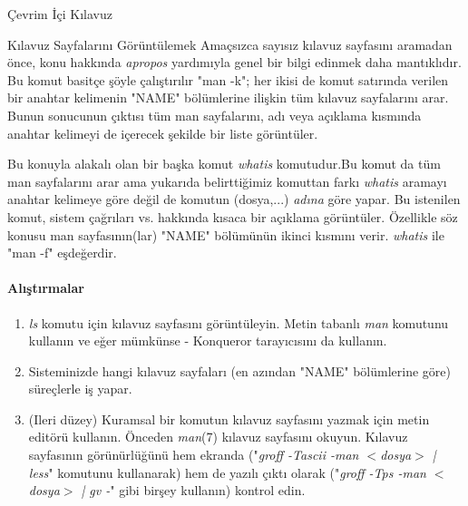 \begin{section}{Çevrim İçi Kılavuz}
\begin{subsection}{Kılavuz Sayfalarını Görüntülemek}
Amaçsızca sayısız kılavuz sayfasını aramadan önce, konu hakkında \emph{apropos} yardımıyla genel bir bilgi edinmek daha mantıklıdır. Bu komut basitçe şöyle çalıştırılır "man -k"; her ikisi de komut satırında verilen bir anahtar kelimenin "NAME" bölümlerine ilişkin tüm kılavuz sayfalarını arar. Bunun sonucunun çıktısı tüm man sayfalarını, adı veya açıklama kısmında anahtar kelimeyi de içerecek şekilde bir liste görüntüler.

Bu konuyla alakalı olan bir başka komut \emph{whatis} komutudur.Bu komut da tüm man sayfalarını arar ama yukarıda belirttiğimiz komuttan farkı \emph{whatis} aramayı anahtar kelimeye göre değil de komutun (dosya,...) \emph{adına} göre yapar. Bu istenilen komut, sistem çağrıları vs. hakkında kısaca bir açıklama görüntüler. Özellikle söz konusu man sayfasının(lar) "NAME" bölümünün ikinci  kısmını verir. \emph{whatis} ile "man -f" eşdeğerdir.
\paragraph{{\Huge{\PencilLeftDown}}Alıştırmalar}{
\begin{enumerate}
 \item \emph{ls} komutu için kılavuz sayfasını görüntüleyin. Metin tabanlı \emph{man} komutunu kullanın ve eğer mümkünse - Konqueror tarayıcısını da kullanın.
 \item Sisteminizde hangi kılavuz sayfaları (en azından "NAME" bölümlerine göre) süreçlerle iş yapar.
 \item (Ileri düzey) Kuramsal bir komutun kılavuz sayfasını yazmak için metin editörü kullanın. Önceden \emph{man}(7) kılavuz sayfasını okuyun. Kılavuz sayfasının görünürlüğünü hem ekranda ("\emph{groff -Tascii -man $<$dosya$>$ | less}" komutunu kullanarak) hem de yazılı çıktı olarak ("\emph{groff -Tps -man $<$dosya$>$ | gv -}" gibi birşey kullanın) kontrol edin.
\end{enumerate}}
\end{subsection}
\end{section}

